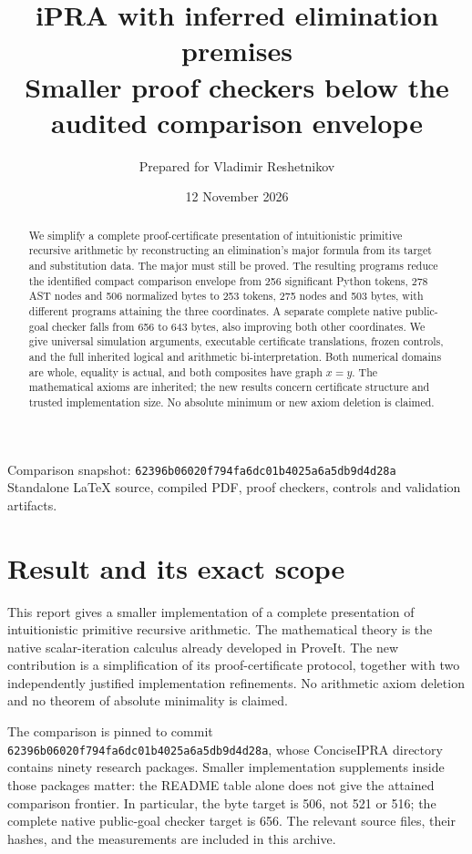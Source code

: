 \documentclass[11pt,letterpaper]{article}
\title{\color{inkblue}\textbf{iPRA with inferred elimination premises}\\[5pt]
\large Smaller proof checkers below the audited comparison envelope}
\author{Prepared for Vladimir Reshetnikov}
\date{12 November 2026}
\theoremstyle{definition}
\begin{document}
\maketitle
\thispagestyle{empty}
\begin{abstract}
We simplify a complete proof-certificate presentation of intuitionistic
primitive recursive arithmetic by reconstructing an elimination's major
formula from its target and substitution data. The major must still be
proved. The resulting programs reduce the identified compact comparison
envelope from 256 significant Python tokens, 278 AST nodes and 506 normalized
bytes to 253 tokens, 275 nodes and 503 bytes, with different programs attaining
the three coordinates. A separate complete native public-goal checker falls
from 656 to 643 bytes, also improving both other coordinates. We give universal
simulation arguments, executable certificate translations, frozen controls,
and the full inherited logical and arithmetic bi-interpretation. Both
numerical domains are whole, equality is actual, and both composites have
graph $x=y$. The mathematical axioms are inherited; the new results concern
certificate structure and trusted implementation size. No absolute minimum
or new axiom deletion is claimed.
\end{abstract}
\vfill
\begin{center}\small
Comparison snapshot: \texttt{62396b06020f794fa6dc01b4025a6a5db9d4d28a}\\
Standalone LaTeX source, compiled PDF, proof checkers, controls and validation artifacts.
\end{center}
\clearpage
\tableofcontents
\clearpage
\section{Result and its exact scope}

This report gives a smaller implementation of a complete presentation of
intuitionistic primitive recursive arithmetic. The mathematical theory is
the native scalar-iteration calculus already developed in ProveIt. The new
contribution is a simplification of its proof-certificate protocol, together
with two independently justified implementation refinements. No arithmetic
axiom deletion and no theorem of absolute minimality is claimed.

The comparison is pinned to commit
\texttt{62396b06020f794fa6dc01b4025a6a5db9d4d28a}, whose ConciseIPRA
directory contains ninety research packages. Smaller implementation
supplements inside those packages matter: the README table alone does not
give the attained comparison frontier.\cite{upstream} In particular, the byte target is
506, not 521 or 516; the complete native public-goal checker target is 656.
The relevant source files, their hashes, and the measurements are included
in this archive.
\end{document}
